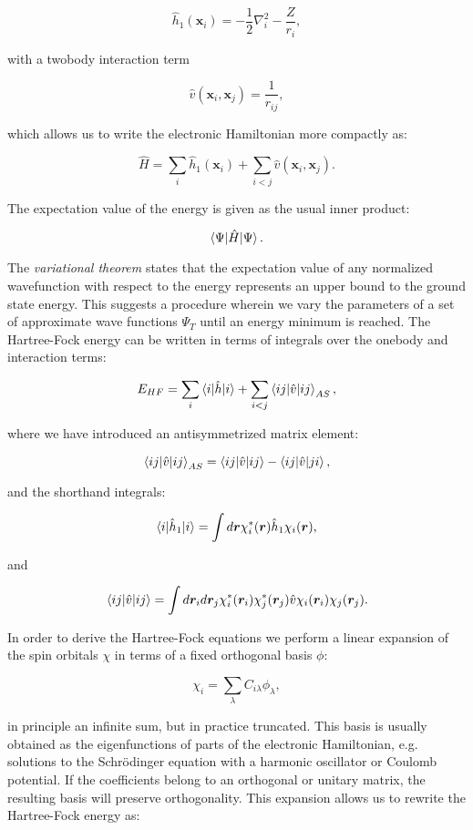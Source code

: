 $$ \hat{h}_1(\bm{x}_i) = -\frac{1}{2} \nabla_i^2
    -\frac{Z}{r_i} , $$

with a twobody interaction term

$$ \hat{v}(\bm{x}_i, \bm{x}_j) = \frac{1}{r_{ij}} , $$

which allows us to write the electronic Hamiltonian more compactly as:

$$ \hat{H} = \sum_i \hat{h}_1(\bm{x}_i)
    + \sum_{i < j} \hat{v}(\bm{x}_i, \bm{x}_j) .$$

The expectation value of the energy is given as the usual inner product:

$$ \braket{\Psi | \hat{H} | \Psi} .$$

The \textit{variational theorem} states that the expectation
value of any normalized wavefunction with respect to the energy
represents an upper bound to the ground state energy.
This suggests a procedure wherein we vary the parameters
of a set of approximate wave functions $\Psi_T$
until an energy minimum is reached.
The Hartree-Fock energy can be written in terms of integrals
over the onebody and interaction terms:

$$ E_{HF} = \sum_i \braket{i | \hat{h} | i}
    + \sum_{i < j} \braket{ij | \hat{v} | ij}_{AS} ,$$

where we have introduced an antisymmetrized matrix element:

$$ \braket{ij | \hat{v} | ij}_{AS}
    = \braket{ij | \hat{v} | ij} - \braket{ij | \hat{v} | ji} , $$

and the shorthand integrals:

$$ \braket{i | \hat{h}_1 | i} =
    \int d\bm{r} \chi_i^*(\bm{r}) \hat{h}_1 \chi_i(\bm{r}) , $$

and

$$ \braket{ij | \hat{v} | ij} =
    \int d\bm{r}_i d\bm{r}_j \chi_i^*(\bm{r}_i) \chi_j^*(\bm{r}_j) 
    \hat{v} \chi_i(\bm{r}_i) \chi_j(\bm{r}_j) . $$

In order to derive the Hartree-Fock equations
we perform a linear expansion of the spin orbitals
$\chi$ in terms of a fixed orthogonal basis $\phi$:

$$ \chi_i = \sum_{\lambda} C_{i\lambda} \phi_{\lambda} , $$

in principle an infinite sum, but in practice truncated.
This basis is usually obtained as the eigenfunctions of
parts of the electronic Hamiltonian, e.g. solutions
to the Schr\"{o}dinger equation with a harmonic oscillator
or Coulomb potential.
If the coefficients belong to an orthogonal or unitary matrix,
the resulting basis will preserve orthogonality.
This expansion allows us to rewrite the Hartree-Fock energy as:

